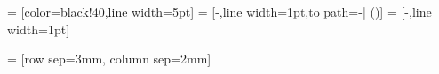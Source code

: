  = [color=black!40,line width=5pt]
 = [-,line width=1pt,to path={-| (\tikztotarget)}]
 = [-,line width=1pt]


 = [row sep=3mm, column sep=2mm]


\newcommand{\MultilineComponent}[3]
{
	\begin{minipage}{#1}
	\begin{center}
		#2 \linebreak #3
	\end{center}
	\end{minipage}
}

\newcommand{\MultiColumnComponent}[5]
{
	\begin{minipage}{#1}
	\begin{center}
	#2 \linebreak #3
	\end{center}
	\begin{minipage}{0.49\textwidth}
	\begin{center}
	#4
	\end{center}
	\end{minipage}
	\begin{minipage}{0.49\textwidth}
	\begin{center}
	#5
	\end{center}
	\end{minipage}
	\end{minipage}
}
